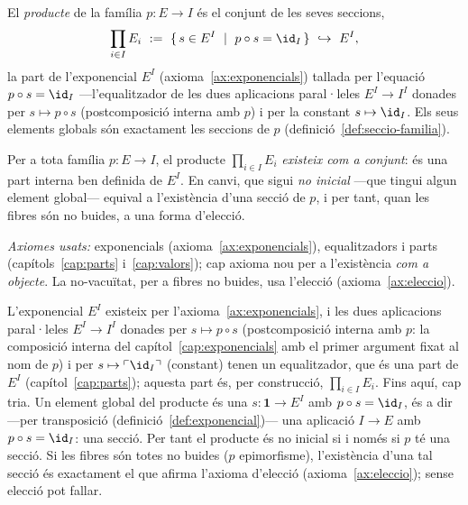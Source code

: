 \begin{definicio}\label{def:producte-familia}
El \emph{producte} de la família \(p\colon E\to I\) és el conjunt de les
seves seccions,
\[
\prod_{i\in I}E_i\ :=\ \{\,s\in E^{I}\ \mid\ p\circ s=\id_I\,\}
\ \hookrightarrow\ E^{I},
\]
la part de l'exponencial \(E^{I}\) (axioma~\ref{ax:exponencials}) tallada per
l'equació \(p\circ s=\id_I\) ---l'equalitzador de les dues aplicacions
paral·leles \(E^{I}\to I^{I}\) donades per \(s\mapsto p\circ s\)
(postcomposició interna amb \(p\)) i per la constant \(s\mapsto\id_I\). Els seus elements
globals són exactament les seccions de \(p\) (definició~\ref{def:seccio-familia}).
\end{definicio}

\begin{proposicio}\label{prop:producte-existeix}
Per a tota família \(p\colon E\to I\), el producte \(\prod_{i\in I}E_i\)
\emph{existeix com a conjunt}: és una part interna ben definida de
\(E^{I}\). En canvi, que sigui \emph{no inicial} ---que tingui algun element
global--- equival a l'existència d'una secció de \(p\), i per tant, quan les
fibres són no buides, a una forma d'elecció.\par
\emph{Axiomes usats:} exponencials (axioma~\ref{ax:exponencials}),
equalitzadors i parts (capítols~\ref{cap:parts} i~\ref{cap:valors}); cap
axioma nou per a l'existència \emph{com a objecte}. La no-vacuïtat, per a
fibres no buides, usa l'elecció (axioma~\ref{ax:eleccio}).
\end{proposicio}

\begin{prova}
L'exponencial \(E^{I}\) existeix per l'axioma~\ref{ax:exponencials}, i les
dues aplicacions paral·leles \(E^{I}\to I^{I}\) donades per
\(s\mapsto p\circ s\) (postcomposició interna amb \(p\): la composició
interna del capítol~\ref{cap:exponencials} amb el primer argument fixat al
nom de \(p\)) i per \(s\mapsto\ulcorner\id_I\urcorner\) (constant) tenen un
equalitzador, que és una part de \(E^{I}\) (capítol~\ref{cap:parts}); aquesta part és, per construcció,
\(\prod_{i\in I}E_i\). Fins aquí, cap tria. Un element global del producte és
una \(s\colon\mathbf1\to E^{I}\) amb \(p\circ s=\id_I\), és a dir ---per
transposició (definició~\ref{def:exponencial})--- una aplicació
\(I\to E\) amb \(p\circ s=\id_I\): una secció. Per tant el producte és no
inicial si i només si \(p\) té una secció. Si les fibres són totes no buides
(\(p\) epimorfisme), l'existència d'una tal secció és exactament el
que afirma l'axioma d'elecció (axioma~\ref{ax:eleccio});
sense elecció pot fallar.
\end{prova}

